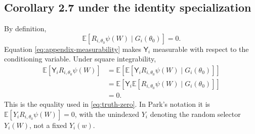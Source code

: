 \documentclass[11pt]{article}
\newcommand{\E}{\mathbb E}
\begin{document}
\subsection{Corollary 2.7 under the identity specialization}

By definition,
\[
 \E[R_{i,\theta_0}\psi(W)\mid G_i(\theta_0)]=0.
\]
Equation \eqref{eq:appendix-measurability} makes \(\mathsf{Y}_i\) measurable
with respect to the conditioning variable. Under square integrability,
\begin{align}
 \E[\mathsf{Y}_iR_{i,\theta_0}\psi(W)]
 &=\E\!\left[
   \E[\mathsf{Y}_iR_{i,\theta_0}\psi(W)\mid G_i(\theta_0)]
 \right] \\
 &=\E\!\left[
   \mathsf{Y}_i
   \E[R_{i,\theta_0}\psi(W)\mid G_i(\theta_0)]
 \right] \\
 &=0.
\end{align}
This is the equality used in \eqref{eq:truth-zero}. In Park's notation it is
\(\E[Y_iR_{i,\theta_0}\psi(W)]=0\), with the unindexed \(Y_i\) denoting the
random selector \(Y_i(W)\), not a fixed \(Y_i(w)\).
\end{document}
